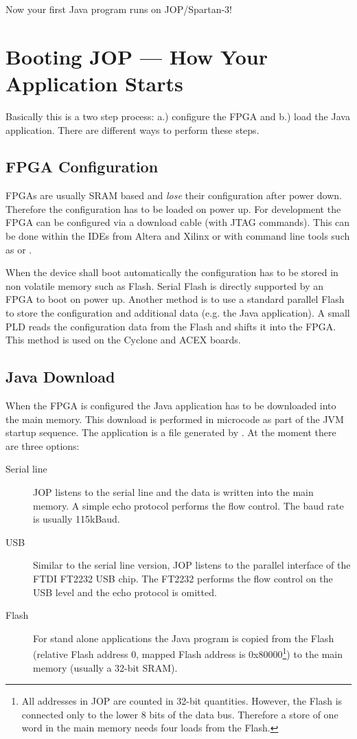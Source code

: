 Now your first Java program runs on JOP/Spartan-3!

\section{Booting JOP --- How Your Application Starts}

Basically this is a two step process: a.) configure the FPGA and b.)
load the Java application. There are different ways to perform these
steps.

\subsection{FPGA Configuration}

FPGAs are usually SRAM based and \emph{lose} their configuration
after power down. Therefore the configuration has to be loaded on
power up. For development the FPGA can be configured via a download
cable (with JTAG commands). This can be done within the IDEs from
Altera and Xilinx or with command line tools such as
 or .

When the device shall boot automatically the configuration has to be
stored in non volatile memory such as Flash. Serial Flash is
directly supported by an FPGA to boot on power up. Another method is
to use a standard parallel Flash to store the configuration and
additional data (e.g. the Java application). A small PLD reads the
configuration data from the Flash and shifts it into the FPGA. This
method is used on the Cyclone and ACEX boards.

\subsection{Java Download}

When the FPGA is configured the Java application has to be
downloaded into the main memory. This download is performed in
microcode as part of the JVM startup sequence. The application is a
 file generated by . At the moment there are
three options:

\begin{description}
    \item[Serial line] JOP listens to the serial line and the data
    is written into the main memory. A simple echo protocol performs
    the flow control. The baud rate is usually 115kBaud.
    \item[USB] Similar to the serial line version, JOP listens to the
    parallel interface of the FTDI FT2232 USB chip. The FT2232
    performs the flow control on the USB level and the echo
    protocol is omitted.
    \item[Flash] For stand alone applications the Java program is
    copied from the Flash (relative Flash address 0, mapped Flash
    address is 0x80000\footnote{All addresses in JOP are counted in
    32-bit quantities. However, the Flash is connected only to the
    lower 8 bits of the data bus. Therefore a store of one word in
    the main memory needs four loads from the Flash.}) to the main
    memory (usually a 32-bit SRAM).
\end{description}


